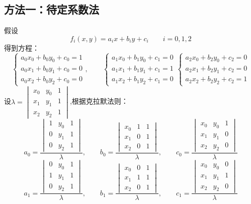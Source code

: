 \documentclass[12pt,a4paper]{article}
\begin{document}
\subsection*{方法一：待定系数法}
假设
$$
f_i(x,y)=a_ix+b_iy+c_i\qquad i=0,1,2
$$
得到方程：
$$
\begin{cases}
a_0x_0+b_0y_0+c_0=1\\
a_0x_1+b_0y_1+c_0=0\\
a_0x_2+b_0y_2+c_0=0
\end{cases},\qquad
\begin{cases}
a_1x_0+b_1y_0+c_1=0\\
a_1x_1+b_1y_1+c_1=1\\
a_1x_2+b_1y_2+c_1=0
\end{cases}
\begin{cases}
a_2x_0+b_2y_0+c_2=0\\
a_2x_1+b_2y_1+c_2=0\\
a_2x_2+b_2y_2+c_2=1
\end{cases}
$$
设$\lambda=\begin{vmatrix}
                           x_0&y_0&1\\
                           x_1&y_1&1\\
                           x_2&y_2&1
                         \end{vmatrix}$,根据克拉默法则：
$$
a_0=\frac{\begin{vmatrix}
            1&y_0&1\\
            0&y_1&1\\
            0&y_2&1
          \end{vmatrix}}{\lambda},\qquad
b_0=\frac{\begin{vmatrix}
            x_0&1&1\\
            x_1&0&1\\
            x_2&0&1
          \end{vmatrix}}{\lambda},\qquad
c_0=\frac{\begin{vmatrix}
             x_0&y_0&1\\
             x_1&y_1&0\\
             x_2&y_2&0
          \end{vmatrix}}{\lambda}
$$
$$
a_1=\frac{\begin{vmatrix}
            0&y_0&1\\
            1&y_1&1\\
            0&y_2&1
          \end{vmatrix}}{\lambda},\qquad
b_1=\frac{\begin{vmatrix}
            x_0&0&1\\
            x_1&1&1\\
            x_2&0&1
          \end{vmatrix}}{\lambda},\qquad
c_1=\frac{\begin{vmatrix}
             x_0&y_0&0\\
             x_1&y_1&1\\
             x_2&y_2&0
          \end{vmatrix}}{\lambda}
$$
\end{document}
